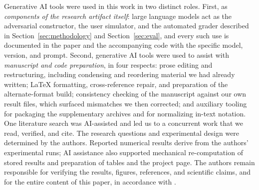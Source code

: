 Generative AI tools were used in this work in two distinct roles. First, as
\emph{components of the research artifact itself}: large language models act as the
adversarial constructor, the user simulator, and the automated grader described in
Section~\ref{sec:methodology} and Section~\ref{sec:eval}, and every such use is
documented in the paper and the accompanying code with the specific model, version,
and prompt. Second, generative AI tools were used to assist with \emph{manuscript and
code preparation}, in four respects: prose editing and restructuring, including
condensing and reordering material we had already written; \LaTeX{} formatting,
cross-reference repair, and preparation of the alternate-format build; consistency
checking of the manuscript against our own result files, which surfaced mismatches we
then corrected; and auxiliary tooling for packaging the supplementary archives and for
normalizing in-text notation. One literature search was AI-assisted and led us to a
concurrent work that we read, verified, and cite.
The research questions and experimental design were determined by the authors.
Reported numerical results derive from the authors' experimental runs; AI assistance
also supported mechanical re-computation of stored results and preparation of tables
and the project page. The authors remain responsible for verifying the results,
figures, references, and scientific claims, and for the entire content of this paper,
in accordance with \ethicscode.
